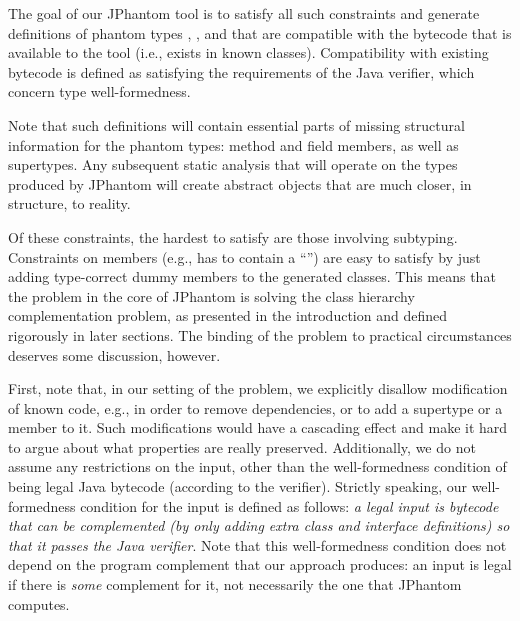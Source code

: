 The goal of our JPhantom tool is to satisfy all such constraints and
generate definitions of phantom types , , and 
that are compatible with the bytecode that is available to the tool
(i.e., exists in known classes). Compatibility with existing bytecode
is defined as satisfying the requirements of the Java verifier, which
concern type well-formedness.

Note that such definitions will contain essential parts of missing
structural information for the phantom types: method and field
members, as well as supertypes. Any subsequent static analysis that
will operate on the types produced by JPhantom will create abstract
objects that are much closer, in structure, to reality.

Of these constraints, the hardest to satisfy are those involving
subtyping.  Constraints on members (e.g.,  has to contain a
``'') are easy to satisfy by just adding type-correct
dummy members to the generated classes. This means that the problem in
the core of JPhantom is solving the class hierarchy complementation
problem, as presented in the introduction and defined rigorously in
later sections. The binding of the problem to practical circumstances
deserves some discussion, however.

First, note that, in our setting of the problem, we explicitly
disallow modification of known code, e.g., in order to remove
dependencies, or to add a supertype or a member to it. Such
modifications would have a cascading effect and make it hard to argue
about what properties are really preserved. Additionally, we do not
assume any restrictions on the input, other than the well-formedness
condition of being legal Java bytecode (according to the
verifier). Strictly speaking, our well-formedness condition for the
input is defined as follows: \emph{a legal input is bytecode that can
  be complemented (by only adding extra class and interface
  definitions) so that it passes the Java verifier}. Note that this
well-formedness condition does not depend on the program complement
that our approach produces: an input is legal if there is \emph{some}
complement for it, not necessarily the one that JPhantom computes.


